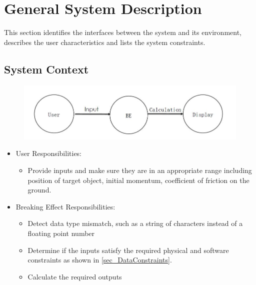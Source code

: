 \documentclass[12pt]{article}
\newcommand{\progname}{Breaking Effect} %
\begin{document}
	\section{General System Description}
	
	This section identifies the interfaces between the system and its environment,
	describes the user characteristics and lists the system constraints.
	
	\subsection{System Context}
	
	\begin{figure}
		\centering
		\includegraphics[width=0.7\linewidth]{./f18}
		\caption{}
		\label{fig:f18}
	\end{figure}
	
	\begin{itemize}
		\item User Responsibilities:
		\begin{itemize}
			\item Provide inputs and make sure they are in an appropriate range including position of target object, initial momentum, coefficient of friction on the ground. 
		\end{itemize}
		\item \progname{} Responsibilities:
		\begin{itemize}
			\item Detect data type mismatch, such as a string of characters instead of a
			floating point number
			\item Determine if the inputs satisfy the required physical and software constraints as shown in \ref{sec_DataConstraints}.​ 
			\item Calculate the required outputs
		\end{itemize}
	\end{itemize}
	
\end{document}
